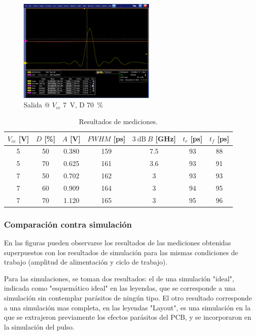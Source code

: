 \begin{figure}
  \centering
    \includegraphics[width=0.6\textwidth]{images/mediciones/vcc_7v_duty_70.png}
    \caption{Salida @ $V_{cc}$ \qty{7}{\volt}, D \qty{70}{\percent} }
    \label{fig:mediciones_7v_70}
\end{figure}

\begin{table}
\centering
\begin{tabular}{ccccccc}
\hline
$V_{cc}$ [\unit{\volt}] & $D$ [\unit{\percent}] & $A$ [\unit{\volt}] &
    $FWHM$ [\unit{\pico\second}] & $\qty{3}{\dB} \ B$ [\unit{\giga\hertz}]& $t_r$
    [\unit{\pico\second}]& $t_f$ [\unit{\pico\second}]\\
\hline
5 & 50 & 0.380 & 159 & 7.5 & 93 & 88 \\
5 & 70 & 0.625 & 161 & 3.6 & 93 & 91 \\
7 & 50 & 0.702 & 162 & 3 & 93 & 93 \\
7 & 60 & 0.909 & 164 & 3 & 94 & 95 \\
7 & 70 & 1.120 & 165 & 3 & 95 & 96 \\
\hline
\end{tabular}
\caption{Resultados de mediciones.}
\label{tab:mediciones_resultados}
\end{table}

\subsubsection{Comparación contra simulación}

En las figuras pueden observarse los resultados de las mediciones obtenidas
superpuestos con los resultados de simulación para las mismas condiciones de
trabajo (amplitud de alimentación y ciclo de trabajo).

Para las simulaciones, se toman dos resultados: el de una simulación "ideal", 
indicada como "esquemático ideal" en las leyendas, que se corresponde a una simulación
sin contemplar parásitos de ningún tipo. El otro resultado corresponde a una simulación
mas completa, en las leyendas "Layout", es una simulación en la que se extrajeron
previamente los efectos parásitos del PCB, y se incorporaron en la simulación
del pulso.

